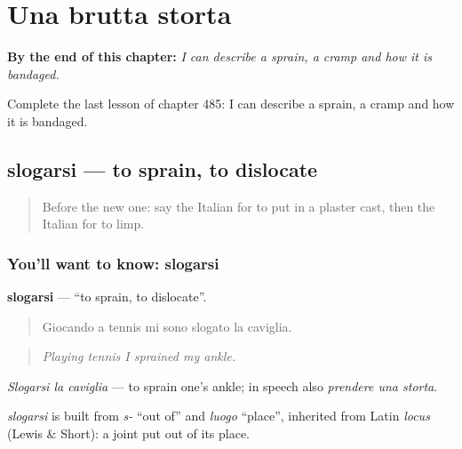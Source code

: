 
\chapter{Una brutta storta}
\label{ch:it-una-brutta-storta}

\begin{chapteropening}
\textbf{By the end of this chapter:} \emph{I can describe a sprain, a cramp and how it is bandaged.}

Complete the last lesson of chapter 485: I can describe a sprain, a cramp and how it is bandaged.
\end{chapteropening}

\section[slogarsi]{slogarsi — to sprain, to dislocate}

\label{lesson:IT-C485-slogarsi}



\begin{quote}
Before the new one: say the Italian for to put in a plaster cast, then the Italian for to limp.
\end{quote}

\subsection*{You'll want to know: slogarsi}
\textbf{slogarsi} — \textquotedblleft{}to sprain, to dislocate\textquotedblright{}.

\begin{quote}
Giocando a tennis mi sono slogato la caviglia.
\end{quote}

\begin{quote}
\emph{Playing tennis I sprained my ankle.}
\end{quote}

\emph{Slogarsi la caviglia} — to sprain one's ankle; in speech also \emph{prendere una storta}.

\begin{cousinweb}
\emph{slogarsi} is built from \emph{s-} \textquotedblleft{}out of\textquotedblright{} and \emph{luogo} \textquotedblleft{}place\textquotedblright{}, inherited from Latin \emph{locus} (Lewis \& Short): a joint put out of its place.
\end{cousinweb}

